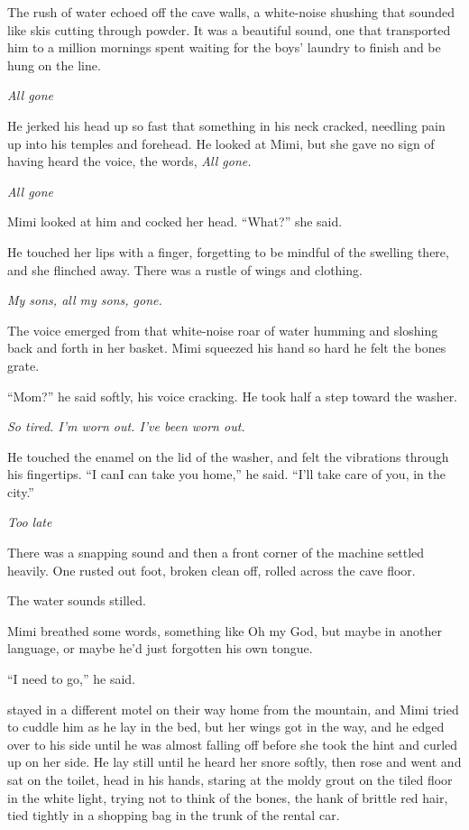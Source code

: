 The rush of water echoed off the cave walls, a white-noise shushing
that sounded like skis cutting through powder.  It was a beautiful
sound, one that transported him to a million mornings spent waiting
for the boys' laundry to finish and be hung on the line.

\textit{All gone}

He jerked his head up so fast that something in his neck cracked,
needling pain up into his temples and forehead.  He looked at Mimi,
but she gave no sign of having heard the voice, the words, \textit{All
gone.}

\textit{All gone}

Mimi looked at him and cocked her head.  ``What?'' she said.

He touched her lips with a finger, forgetting to be mindful of the
swelling there, and she flinched away.  There was a rustle of wings
and clothing.

\textit{My sons, all my sons, gone.}

The voice emerged from that white-noise roar of water humming and
sloshing back and forth in her basket.  Mimi squeezed his hand so hard
he felt the bones grate.

``Mom?'' he said softly, his voice cracking.  He took half a step
toward the washer.

\textit{So tired.  I'm worn out.  I've been worn out.}

He touched the enamel on the lid of the washer, and felt the
vibrations through his fingertips.  ``I can\dash{}I can take you home,''
he said.  ``I'll take care of you, in the city.''

\textit{Too late}

There was a snapping sound and then a front corner of the machine
settled heavily.  One rusted out foot, broken clean off, rolled across
the cave floor.

The water sounds stilled.

Mimi breathed some words, something like Oh my God, but maybe in
another language, or maybe he'd just forgotten his own tongue.

``I need to go,'' he said.

 stayed in a different motel on their way home from the mountain,
and Mimi tried to cuddle him as he lay in the bed, but her wings got
in the way, and he edged over to his side until he was almost falling
off before she took the hint and curled up on her side.  He lay still
until he heard her snore softly, then rose and went and sat on the
toilet, head in his hands, staring at the moldy grout on the tiled
floor in the white light, trying not to think of the bones, the hank
of brittle red hair, tied tightly in a shopping bag in the trunk of
the rental car.

